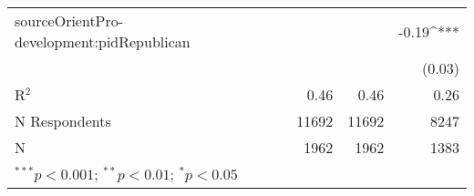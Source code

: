 \begin{table}[h!]
\begin{center}
\begin{footnotesize}
\begin{tabular}{l D{.}{.}{5.5} D{.}{.}{5.5} D{.}{.}{4.5}}
sourceOrientPro-development:pidRepublican &            &            & -0.19^{***} \\
                                          &            &            & (0.03)      \\
\midrule
R$^2$                                     & 0.46       & 0.46       & 0.26        \\
N Respondents                             & 11692      & 11692      & 8247        \\
N                                         & 1962       & 1962       & 1383        \\
\bottomrule
{}
\end{tabular}
\end{footnotesize}
\label{table:ra-source-interact}
\end{center}
\end{table} 

